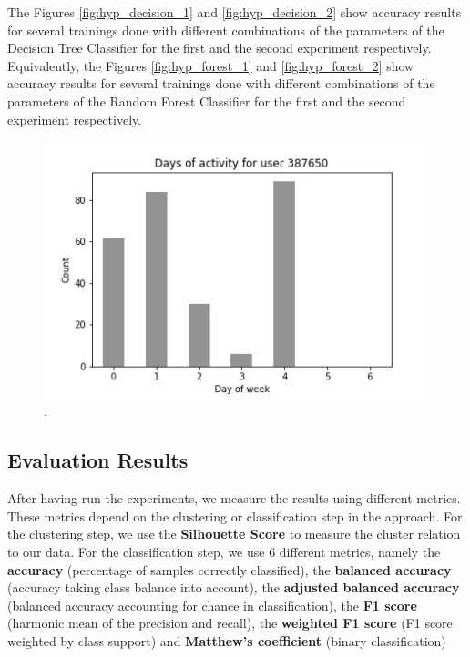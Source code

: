 \documentclass[sigplan,screen]{acmart}
\begin{document}

The Figures \ref{fig:hyp_decision_1} and \ref{fig:hyp_decision_2} show accuracy results for several trainings done with different combinations of the parameters of the Decision Tree Classifier for the first and the second experiment respectively. Equivalently, the Figures \ref{fig:hyp_forest_1} and \ref{fig:hyp_forest_2} show accuracy results for several trainings done with different combinations of the parameters of the Random Forest Classifier for the first and the second experiment respectively.

\begin{figure}
    \centering
    \includegraphics[width=\linewidth]{reports/figures/PWHex.jpg}
    \caption{.}
    \label{fig:PWHex}
\end{figure}

\subsection{Evaluation Results}\label{subsec:eval_results}

After having run the experiments, we measure the results using different metrics. These metrics depend on the clustering or classification step in the approach. For the clustering step, we use the \textbf{Silhouette Score} to measure the cluster relation to our data. For the classification step, we use 6 different metrics, namely the \textbf{accuracy} (percentage of samples correctly classified), the \textbf{balanced accuracy} (accuracy taking class balance into account), the \textbf{adjusted balanced accuracy} (balanced accuracy accounting for chance in classification), the \textbf{F1 score} (harmonic mean of the precision and recall), the \textbf{weighted F1 score} (F1 score weighted by class support) and \textbf{Matthew's coefficient} (binary classification)
\end{document}
